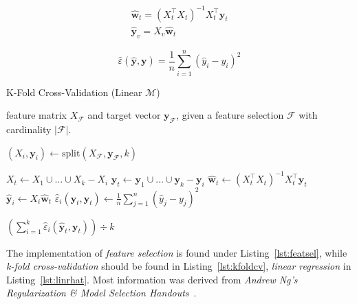 \documentclass[a4paper, twocolumn]{article}
\begin{document}
    \begin{gather} \label{eq:linrhat}
        \mathbf{\hat{w}}^{}_t = (X_t^\intercal X^{}_t)^{-1} X_t^\intercal \mathbf{y}^{}_t \\
        \mathbf{\hat{y}}^{}_v = X^{}_v \mathbf{\hat{w}}^{}_t
    \end{gather}

    \begin{equation} \label{eq:mse}
        \hat{\varepsilon}(\mathbf{\hat{y}}, \mathbf{y}) = \frac{1}{n}\sum_{i=1}^{n}(\hat{y}_i - y_i)^2
    \end{equation}

    \begin{algorithm}
        \caption{K-Fold Cross-Validation (Linear $\mathcal{M}$)}
    \label{alg:kfoldcv}
    \begin{algorithmic}[1]
        \REQUIRE feature matrix $X_\mathcal{F}$ and target vector $\mathbf{y_\mathcal{F}}$,
                 given a feature selection $\mathcal{F}$ with cardinality $|\mathcal{F}|$.

        \STATE $(X_i, \mathbf{y}_i) \leftarrow \mathrm{split}(X_\mathcal{F}, \mathbf{y}_\mathcal{F}, k)$ 

            \STATE $X_t \leftarrow X_1 \cup \dots \cup X_k - X_i$ 
            \STATE $\mathbf{y}_t \leftarrow \mathbf{y}_1 \cup \dots \cup \mathbf{y}_k - \mathbf{y}_i$ 
            \STATE $\mathbf{\hat{w}}_t \leftarrow (X_t^\intercal X^{}_t)^{-1} X_t^\intercal \mathbf{y}^{}_t$ 
            \STATE $\mathbf{\hat{y}}^{}_i \leftarrow X^{}_i \mathbf{\hat{w}}^{}_t$ 
            \STATE $\hat{\varepsilon}_i(\mathbf{\hat{y}}_t, \mathbf{y}_t) \leftarrow \frac{1}{n}\sum_{j=1}^{n}(\hat{y}_j - y_j)^2$
        \ENDFOR

        \RETURN $(\sum_{i=1}^k{\hat{\varepsilon}_i(\mathbf{\hat{y}}_t, \mathbf{y}_t)}) \div k$
    \end{algorithmic}
    \end{algorithm}

    The implementation of \emph{feature selection} is found under Listing~\ref{lst:featsel}, while \emph{k-fold cross-validation} should be found in Listing~\ref{lst:kfoldcv}, \emph{linear regression} in Listing~\ref{lst:linrhat}. Most information was derived from \emph{Andrew Ng's Regularization \& Model Selection Handouts}~\cite{ng2016notes}.
\end{document}
